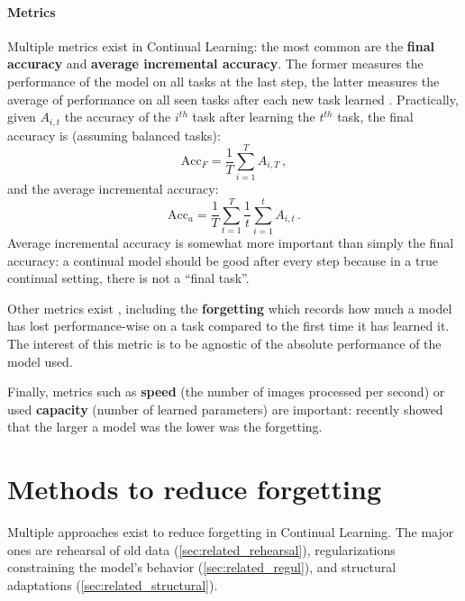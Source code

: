 \paragraph{Metrics} Multiple metrics exist in Continual Learning: the most common are the
\textbf{final accuracy} and \textbf{average incremental accuracy}. The former measures the
performance of the model on all tasks at the last step, the latter measures the average of
performance on all seen tasks after each new task learned \citep{rebuffi2017icarl}. Practically,
given $A_{i,t}$ the accuracy of the $i^{th}$ task after learning the $t^{th}$ task, the final
accuracy is (assuming balanced tasks):
%
\begin{equation}
      \text{Acc}_F = \frac{1}{T} \sum_{i=1}^T A_{i,T}\,,
      \label{eq:related_final_acc}
\end{equation}
%
and the average incremental accuracy:
%
\begin{equation}
      \text{Acc}_a = \frac{1}{T} \sum_{t=1}^T \frac{1}{t}  \sum_{i=1}^t A_{i,t}\,.
      \label{eq:related_avg_acc}
\end{equation}
%
Average incremental accuracy is somewhat more important than simply the final accuracy: a continual
model should be good after every step because in a true continual setting, there is not a ``final
task''.

Other metrics exist \citep{diaz2018continualmetrics}, including the \textbf{forgetting}
\citep{chaudhry2018riemannien_walk} which records how much a model has lost performance-wise on a
task compared to the first time it has learned it. The interest of this metric is to be agnostic of
the absolute performance of the model used.

Finally, metrics such as \textbf{speed} (\ie the number of images processed per second) or used
\textbf{capacity} (\ie number of learned parameters) are important:
\cite{ramasesh2022scalecontinual} recently showed that the larger a model was the lower was the
forgetting.

\section{Methods to reduce forgetting}
\label{sec:related_methods}

Multiple approaches exist to reduce forgetting in Continual Learning. The major ones are
rehearsal of old data (\autoref{sec:related_rehearsal}), regularizations constraining the model's
behavior (\autoref{sec:related_regul}), and structural adaptations (\autoref{sec:related_structural}).

